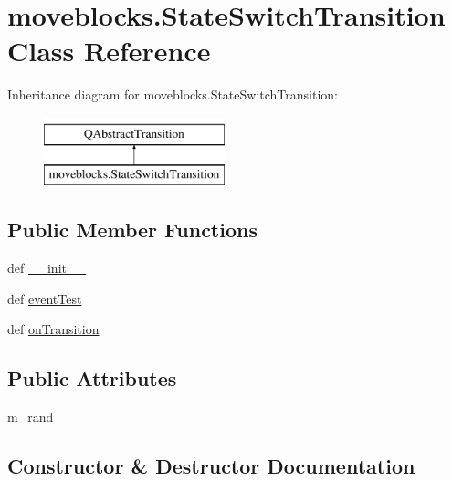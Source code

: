 \hypertarget{classmoveblocks_1_1StateSwitchTransition}{}\section{moveblocks.\+State\+Switch\+Transition Class Reference}
\label{classmoveblocks_1_1StateSwitchTransition}
Inheritance diagram for moveblocks.\+State\+Switch\+Transition\+:\begin{figure}[H]
\begin{center}
\leavevmode
\includegraphics[height=2.000000cm]{classmoveblocks_1_1StateSwitchTransition}
\end{center}
\end{figure}
\subsection*{Public Member Functions}
\begin{DoxyCompactItemize}
\item 
def \hyperlink{classmoveblocks_1_1StateSwitchTransition_aaec8f4bd3bb47c5c2f5c25457cfbbb02}{\+\_\+\+\_\+init\+\_\+\+\_\+}
\item 
def \hyperlink{classmoveblocks_1_1StateSwitchTransition_a23a5d2b86374a5beb2ac8b8b799a8a7f}{event\+Test}
\item 
def \hyperlink{classmoveblocks_1_1StateSwitchTransition_a0210d2579efe8aecf4e52603b984a2cb}{on\+Transition}
\end{DoxyCompactItemize}
\subsection*{Public Attributes}
\begin{DoxyCompactItemize}
\item 
\hyperlink{classmoveblocks_1_1StateSwitchTransition_a46d6eb4b55c5a9a2c3b85bc07535f07c}{m\+\_\+rand}
\end{DoxyCompactItemize}


\subsection{Constructor \& Destructor Documentation}
\hypertarget{classmoveblocks_1_1StateSwitchTransition_aaec8f4bd3bb47c5c2f5c25457cfbbb02}{}
